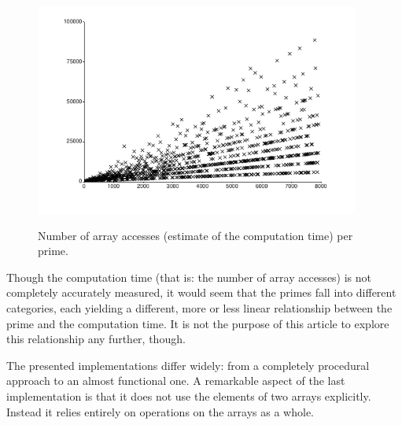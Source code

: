 \documentclass[onecolumn]{article}
\begin{document}
\begin{figure}[h]
\begin{center}
\caption{Number of array accesses (estimate of the computation time) per prime.}
\includegraphics[width=0.95\textwidth]{computation_time.pdf}
\label{definition_sketch}
\end{center}
\end{figure}


Though the computation time (that is: the number of array accesses) is not completely accurately measured,
it would seem that the primes fall into different categories, each yielding a different, more or less linear
relationship between the prime and the computation time. It is not the purpose of this article to explore this
relationship any further, though.

The presented implementations differ widely: from a completely procedural approach to an almost functional one.
A remarkable aspect of the last implementation is that it does not use the elements of two arrays explicitly.
Instead it relies entirely on operations on the arrays as a whole.



\end{document}
